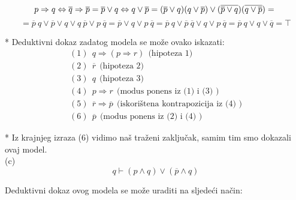 \documentclass[12pt]{article}
\begin{document}
\begin{enumerate}
	    \begin{equation*}
	        p \Rightarrow q \Leftrightarrow \overline{q} \Rightarrow \overline{p} =
	        \overline{p} \vee q \Leftrightarrow q \vee \overline{p} =
	        (\overline{p} \vee q)(q \vee \overline{p}) \vee (\overline{\overline{p} \vee q})(\overline{q \vee \overline{p}}) = \\
	        \end{equation*}
	        \begin{equation*}
	        = \overline{p}~q \vee \overline{p} \vee q \vee q~\overline{p} \vee p~\overline{q} =
	        \overline{p} \vee q \vee p~\overline{q} = \overline{p}~q \vee \overline{p}~\overline{q} \vee q \vee p~\overline{q} = \overline{p}~q \vee q \vee \overline{q} = \top       
	    \end{equation*}

	    * Deduktivni dokaz zadatog modela se može ovako iskazati: 
	    \begin{align*}
	    
	        (1)~~ q \Rightarrow (p \Rightarrow r) ~~ \text{(hipoteza 1)} \\
	        
	        (2)~~ \overline{r} ~~ \text{(hipoteza 2)} \\
	        
	        (3)~~ q ~~ \text{(hipoteza 3)} \\
	        
	        (4)~~ p \Rightarrow r ~~ \text{(modus ponens iz (1) i (3)~)} \\
	        
	        (5)~~ \overline{r} \Rightarrow \overline{p} ~~ \text{(iskorištena kontrapozicija iz (4)~)} \\
	        
	        (6)~~ \overline{p} ~~ \text{(modus ponens iz (2) i (4)~)}
	    \end{align*}
	    
	    * Iz krajnjeg izraza (6) vidimo naš traženi zaključak, samim tim smo dokazali ovaj model. \\
	    
	    (c) \begin{equation*}
	        q \vdash (p \wedge q) \vee (\overline{p} \wedge q)
	    \end{equation*}
	    
	    Deduktivni dokaz ovog modela se može uraditi na sljedeći način: \\
	    \begin{equation*}
	        

\end{equation*}
\end{enumerate}
\end{document}
